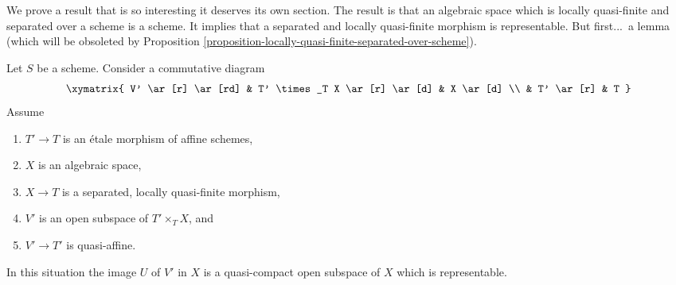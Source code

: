 \noindent
We prove a result that is so interesting it deserves its own section.
The result is that an algebraic space which is locally quasi-finite and
separated over a scheme is a scheme. It implies that a separated
and locally quasi-finite morphism is representable. But first...\ a lemma
(which will be obsoleted by
Proposition \ref{proposition-locally-quasi-finite-separated-over-scheme}).

\begin{lemma}
\label{lemma-neighbourhood-scheme}
Let $S$ be a scheme. Consider a commutative diagram
$$
\xymatrix{
V' \ar[r] \ar[rd] & T' \times_T X \ar[r] \ar[d] & X \ar[d] \\
& T' \ar[r] & T
}
$$
Assume
\begin{enumerate}
\item $T' \to T$ is an \'etale morphism of affine schemes,
\item $X$ is an algebraic space,
\item $X \to T$ is a separated, locally quasi-finite morphism,
\item $V'$ is an open subspace of $T' \times_T X$, and
\item $V' \to T'$ is quasi-affine.
\end{enumerate}
In this situation the image $U$ of $V'$ in $X$ is a quasi-compact
open subspace of $X$ which is representable.
\end{lemma}

